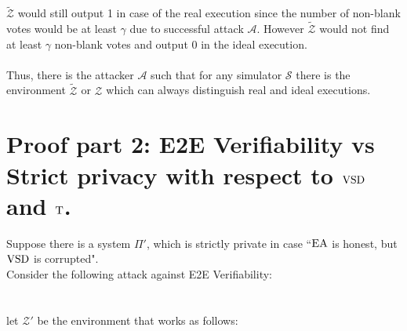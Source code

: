 $\tilde{\mathcal{Z}}$ would still output 1 in case of the real execution since the number of non-blank votes would be at least $\gamma$ due to successful attack  $\mathcal{A}$. However  $\tilde{\mathcal{Z}}$ would not find at least $\gamma$ non-blank votes and output 0 in the ideal execution. \\\\
Thus, there is the attacker $\mathcal{A}$ such that for any simulator $\mathcal{S}$ there is the environment $\tilde{\mathcal{Z}}$ or $\mathcal{Z}$ which can always distinguish real and ideal executions. \\

\section{Proof part 2: E2E Verifiability vs Strict privacy with respect to $\operatorname{VSD}$ and $\operatorname{T}$.}
Suppose there is a system $\Pi'$, which is strictly private in case ``$\operatorname{EA}$ is honest, but $\operatorname{VSD}$ is corrupted".\\
Consider the following attack against E2E Verifiability: \\
\\\\
let $\mathcal{Z'}$ be the environment that works as follows:\\\\
